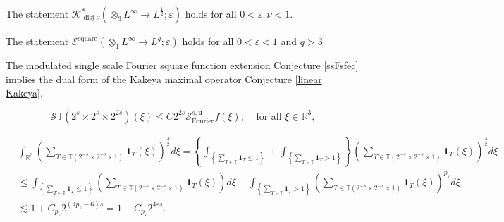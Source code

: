 \documentclass[10pt,a4paper]{amsart}
\begin{document}
\begin{conjecture}
\label{trilinear Kakeya}The statement $\mathcal{K}%
_{\operatorname*{disj}\nu}^{\ast}\left(  \otimes_{3}L^{\infty}\rightarrow
L^{\frac{1}{2}};\varepsilon\right)  $ holds for all $0<\varepsilon,\nu<1$.
\end{conjecture}

\begin{conjecture}
%
\label{ssFsfec}The statement $\mathcal{E}^{\operatorname*{square}}\left(
\otimes_{1}L^{\infty}\rightarrow L^{q};\varepsilon\right)  $ holds for all
$0<\varepsilon<1$ and $q>3$.
\end{conjecture}

\begin{proposition}
\label{Kak Four}The modulated single scale Fourier square function extension
Conjecture \ref{ssFsfec} implies the dual form of the Kakeya maximal operator
Conjecture \ref{linear Kakeya}.
\end{proposition}

\begin{equation}
\mathcal{S}\mathbb{T}\left(  2^{s}\times2^{s}\times2^{2s}\right)  \left(
\xi\right)  \leq C2^{2s}\mathcal{S}_{\operatorname*{Fourier}}^{s,\mathbf{u}%
}f\left(  \xi\right)  ,\ \ \ \ \ \text{for all }\xi\in\mathbb{R}^{3},
\label{square point}%
\end{equation}

\begin{align}
&  \int_{\mathbb{R}^{3}}\left(  \sum_{T\in\mathbb{T}\left(  2^{-s}\times
2^{-s}\times1\right)  }\mathbf{1}_{T}\left(  \xi\right)  \right)  ^{\frac
{3}{2}}d\xi=\left\{  \int_{\left\{  \sum_{T\in\mathbb{T}}\mathbf{1}_{T}%
\leq1\right\}  }+\int_{\left\{  \sum_{T\in\mathbb{T}}\mathbf{1}_{T}>1\right\}
}\right\}  \left(  \sum_{T\in\mathbb{T}\left(  2^{-s}\times2^{-s}%
\times1\right)  }\mathbf{1}_{T}\left(  \xi\right)  \right)  ^{\frac{3}{2}}%
d\xi\label{interp}\\
&  \leq\int_{\left\{  \sum_{T\in\mathbb{T}}\mathbf{1}_{T}\leq1\right\}
}\left(  \sum_{T\in\mathbb{T}\left(  2^{-s}\times2^{-s}\times1\right)
}\mathbf{1}_{T}\left(  \xi\right)  \right)  d\xi+\int_{\left\{  \sum
_{T\in\mathbb{T}}\mathbf{1}_{T}>1\right\}  }\left(  \sum_{T\in\mathbb{T}%
\left(  2^{-s}\times2^{-s}\times1\right)  }\mathbf{1}_{T}\left(  \xi\right)
\right)  ^{p_{\varepsilon}}d\xi\nonumber\\
&  \lesssim1+C_{p_{\varepsilon}}2^{\left(  4p_{\varepsilon}-6\right)
s}=1+C_{p_{\varepsilon}}2^{4\varepsilon s}.\nonumber
\end{align}
\end{document}

